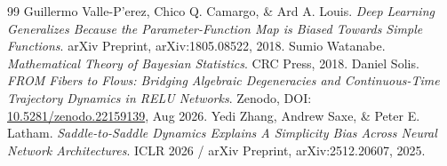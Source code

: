 \documentclass[11pt]{article}
\begin{document}
\begin{thebibliography}{99}
 Guillermo Valle-P'erez, Chico Q. Camargo, \& Ard A. Louis. \textit{Deep Learning Generalizes Because the Parameter-Function Map is Biased Towards Simple Functions}. arXiv Preprint, arXiv:1805.08522, 2018.
 Sumio Watanabe. \textit{Mathematical Theory of Bayesian Statistics}. CRC Press, 2018.
 Daniel Solis. \textit{FROM Fibers to Flows: Bridging Algebraic Degeneracies and Continuous-Time Trajectory Dynamics in RELU Networks}. Zenodo, DOI: \href{https://doi.org/10.5281/zenodo.22159139}{10.5281/zenodo.22159139}, Aug 2026.
 Yedi Zhang, Andrew Saxe, \& Peter E. Latham. \textit{Saddle-to-Saddle Dynamics Explains A Simplicity Bias Across Neural Network Architectures}. ICLR 2026 / arXiv Preprint, arXiv:2512.20607, 2025.
\end{thebibliography}
\end{document}
